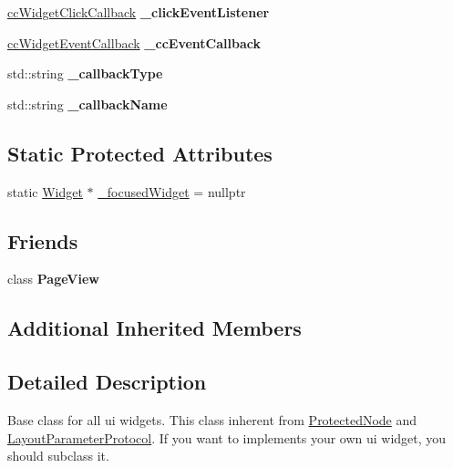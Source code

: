 \begin{DoxyCompactItemize}
\mbox{\label{classui_1_1Widget_a2457f995ad4f2b302b42f04362daa568}} 
\hyperlink{classui_1_1Widget_a01110bd071334e41c48ee0bec593db61}{cc\+Widget\+Click\+Callback} {\bfseries \+\_\+click\+Event\+Listener}
\item 
\mbox{\label{classui_1_1Widget_af55e7889520222f99f8ad821c5ebd091}} 
\hyperlink{classui_1_1Widget_a15b83a56c3c29442ec103100b45e56c7}{cc\+Widget\+Event\+Callback} {\bfseries \+\_\+cc\+Event\+Callback}
\item 
\mbox{\label{classui_1_1Widget_a2299e3abbf9c11e8b182d16aae29d300}} 
std\+::string {\bfseries \+\_\+callback\+Type}
\item 
\mbox{\label{classui_1_1Widget_a8e6a7f8f3e8cd96f86aeaa6a343efdd0}} 
std\+::string {\bfseries \+\_\+callback\+Name}
\end{DoxyCompactItemize}
\subsection*{Static Protected Attributes}
\begin{DoxyCompactItemize}
\item 
static \hyperlink{classui_1_1Widget}{Widget} $\ast$ \hyperlink{classui_1_1Widget_a739f4bacda986ae760ef6f68678ca617}{\+\_\+focused\+Widget} = nullptr
\end{DoxyCompactItemize}
\subsection*{Friends}
\begin{DoxyCompactItemize}
\item 
\mbox{\label{classui_1_1Widget_a9d4c6af640965efe1f0d1225c333cb87}} 
class {\bfseries Page\+View}
\end{DoxyCompactItemize}
\subsection*{Additional Inherited Members}


\subsection{Detailed Description}
Base class for all ui widgets. This class inherent from {\ttfamily \hyperlink{classProtectedNode}{Protected\+Node}} and {\ttfamily \hyperlink{classui_1_1LayoutParameterProtocol}{Layout\+Parameter\+Protocol}}. If you want to implements your own ui widget, you should subclass it. 

